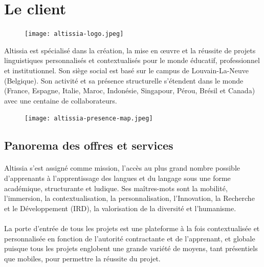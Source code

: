 \section{Le client}
\label{sec:customer}

\begin{figure}
    \centering
    \texttt{[image: altissia-logo.jpeg]}
\end{figure}

Altissia\fnmark{} est spécialisé dans la création, la mise en œuvre et la réussite de projets linguistiques personnalisés et contextualisés pour le monde éducatif, professionnel et institutionnel.  
Son siège social est basé sur le campus de Louvain-La-Neuve (Belgique).
Son activité et sa présence structurelle s’étendent dans le monde (France, Espagne, Italie, Maroc, Indonésie, Singapour, Pérou, Brésil et Canada) avec une centaine de collaborateurs.
\begin{figure}
    \centering
    \texttt{[image: altissia-presence-map.jpeg]}
\end{figure}


\subsection{Panorema des offres et services}
\paragraph{}
Altissia s’est assigné comme mission, l’accès au plus grand nombre possible d’apprenants à l’apprentissage des langues et du langage sous une forme académique, structurante et ludique. Ses maîtres-mots sont la mobilité, l’immersion, la contextualisation, la personnalisation, l’Innovation, la Recherche et le Développement (IRD), la valorisation de la diversité et l’humanisme.

\paragraph{}
La porte d’entrée de tous les projets est une plateforme à la fois contextualisée et personnalisée en fonction de l’autorité contractante et de l’apprenant,
et globale puisque tous les projets englobent une grande variété de moyens,
tant présentiels que mobiles, pour permettre la réussite du projet.

